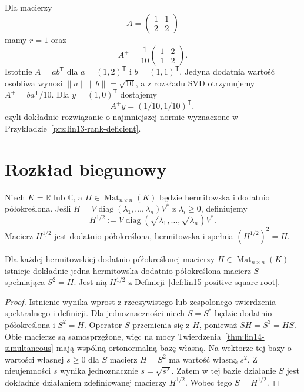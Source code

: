 \begin{przyklad}
\label{prz:lin15-pseudoinverse}
Dla macierzy
\[
 A=\begin{pmatrix}1&1\\2&2\end{pmatrix}
\]
mamy \(r=1\) oraz
\[
 A^+=\frac1{10}
 \begin{pmatrix}1&2\\1&2\end{pmatrix}.
\]
Istotnie \(A=ab^{\mathsf T}\)
dla \(a=(1,2)^{\mathsf T}\)
i \(b=(1,1)^{\mathsf T}\).
Jedyna dodatnia wartość
osobliwa wynosi
\(\|a\|\|b\|=\sqrt{10}\),
a z rozkładu SVD otrzymujemy
\(A^+=ba^{\mathsf T}/10\).
Dla \(y=(1,0)^{\mathsf T}\)
dostajemy
\[
 A^+y=(1/10,1/10)^{\mathsf T},
\]
czyli dokładnie rozwiązanie
o najmniejszej normie
wyznaczone w
Przykładzie~\ref{prz:lin13-rank-deficient}.
\end{przyklad}

\section{Rozkład biegunowy}
\label{sec:lin15-polar}

\begin{definicja}
\label{def:lin15-positive-square-root}
Niech \(K=\mathbb R\) lub \(\mathbb C\),
a \(H\in\operatorname{Mat}_{n\times n}(K)\)
będzie hermitowska
i dodatnio półokreślona.
Jeśli
\(H=V\operatorname{diag}(\lambda_1,\ldots,
\lambda_n)V^*\) z \(\lambda_i\ge0\),
definiujemy
\[
 H^{1/2}
 :=V\operatorname{diag}(\sqrt{\lambda_1},
 \ldots,\sqrt{\lambda_n})V^*.
\]
Macierz \(H^{1/2}\)
jest dodatnio półokreślona,
hermitowska i spełnia
\((H^{1/2})^2=H\).
\end{definicja}

\begin{stwierdzenie}
\label{prop:lin15-positive-root}
Dla każdej hermitowskiej
dodatnio półokreślonej macierzy
\(H\in\operatorname{Mat}_{n\times n}(K)\)
istnieje dokładnie jedna
hermitowska dodatnio półokreślona
macierz \(S\) spełniająca \(S^2=H\).
Jest nią \(H^{1/2}\)
z
Definicji~\ref{def:lin15-positive-square-root}.
\end{stwierdzenie}
\begin{proof}
Istnienie wynika wprost
z rzeczywistego lub zespolonego
twierdzenia spektralnego
i definicji.
Dla jednoznaczności niech
\(S=S^*\) będzie dodatnio
półokreślona i \(S^2=H\).
Operator \(S\) przemienia się z \(H\),
ponieważ \(SH=S^3=HS\).
Obie macierze są samosprzężone,
więc na mocy
Twierdzenia~\ref{thm:lin14-simultaneous}
mają wspólną ortonormalną bazę własną.
Na wektorze tej bazy
o wartości własnej
\(s\ge0\) dla \(S\)
macierz \(H=S^2\)
ma wartość własną \(s^2\).
Z nieujemności \(s\)
wynika jednoznacznie
\(s=\sqrt{s^2}\).
Zatem w tej bazie działanie
\(S\) jest dokładnie
działaniem zdefiniowanej
macierzy \(H^{1/2}\).
Wobec tego \(S=H^{1/2}\).
\end{proof}

